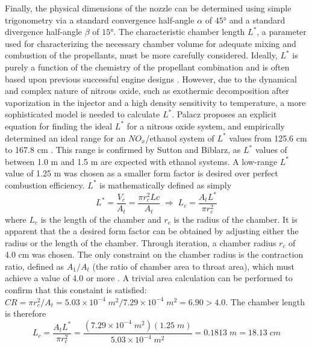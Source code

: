 \documentclass[9pt]{article} %
\numberwithin{equation}{section} %
\begin{document}
Finally, the physical dimensions of the nozzle can be determined using simple trigonometry via a standard convergence half-angle $\alpha$ of $\ang{45}$ and a standard divergence half-angle $\beta$ of $\ang{15}$. The characteristic chamber length $L^{*}$, a parameter used for characterizing the necessary chamber volume for adequate mixing and combustion of the propellants, must be more carefully considered. Ideally, $L^{*}$ is purely a function of the chemistry of the propellant combination and is often based upon previous successful engine designs \cite{rpe}. However, due to the dynamical and complex nature of nitrous oxide, such as exothermic decomposition after vaporization in the injector and a high density sensitivity to temperature, a more sophisticated model is needed to calculate $L^{*}$. Palacz proposes an explicit equation for finding the ideal $L^{*}$ for a nitrous oxide system, and empirically determined an ideal range for an $NO_{x}$/ethanol system of $L^{*}$ values from 125.6 cm to 167.8 cm \cite{nitrous-paper}. This range is confirmed by Sutton and Biblarz, as $L^{*}$ values of between 1.0 m and 1.5 m are expected with ethanol systems. A low-range $L^{*}$ value of 1.25 m was chosen as a smaller form factor is desired over perfect combustion efficiency. $L^{*}$ is mathematically defined as simply
\begin{equation} \label{eq:l_star}
L^{*} = \frac{V_{c}}{A_{t}} = \frac{\pi r_{c}^{2} L{c}}{A_{t}} \; \Longrightarrow \; L_{c} = \frac{A_{t} L^{*}}{\pi r_{c}^{2}}
\end{equation}
where $L_{c}$ is the length of the chamber and $r_{c}$ is the radius of the chamber. It is apparent that the a desired form factor can be obtained by adjusting either the radius or the length of the chamber. Through iteration, a chamber radius $r_{c}$ of 4.0 cm was chosen. The only constraint on the chamber radius is the contraction ratio, defined as $A_{1}/A_{t}$ (the ratio of chamber area to throat area), which must achieve a value of 4.0 or more \cite{rpe}. A trivial area calculation can be performed to confirm that this constaint is satisfied: $CR =  \pi r_{c}^{2}/A_{t} = 5.03 \times 10^{-4} \; m^{2} / 7.29 \times 10^{-4} \; m^{2} = 6.90 > 4.0$. The chamber length is therefore
\begin{equation*}
L_{c} = \frac{A_{t} L^{*}}{\pi r_{c}^{2}} = \frac{(7.29 \times 10^{-4} \; m^{2})(1.25 \; m)}{5.03 \times 10^{-4} \; m^{2}} = 0.1813 \; m = 18.13 \; cm
\end{equation*}
\end{document}
